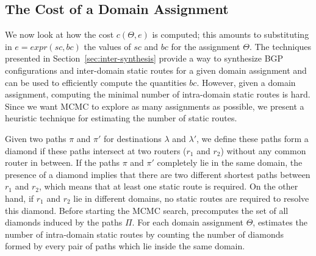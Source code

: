 \subsection{The Cost of a Domain Assignment}
We now look at how the cost  $c(\Theta,e)$
is computed; this amounts  
to substituting in 
$e=expr(sc, bc)$
the values of 
$sc$ and $bc$ for the assignment $\Theta$.
The techniques presented in Section~\ref{sec:inter-synthesis} 
provide a way to 
synthesize BGP configurations and 
inter-domain static routes for a 
given domain assignment
and can be used to 
efficiently compute the quantities $bc$.
However, given a domain assignment, 
computing the  
minimal number of intra-domain 
static routes 
is hard.
Since we want MCMC to 
explore as many assignments as possible,
we present a heuristic technique for estimating
 the number of static routes.



Given two paths $\pi$ and $\pi'$ for destinations 
$\lambda$ and $\lambda'$, we define these paths form a diamond
if these paths intersect at two routers ($r_1$ and $r_2$) 
without any common router in between. 
If the paths $\pi$ and $\pi'$ completely lie in the same domain,
the presence of a diamond 
implies that there are two different 
shortest paths between $r_1$ and $r_2$, 
which means that
at least one static route is required.
On the other hand, if $r_1$ and $r_2$ lie in
different domains, no static routes 
are required to resolve this diamond. 
Before  starting the MCMC search, \name precomputes
the set of all diamonds induced by the paths $\Pi$. 
For each
domain assignment $\Theta$,
\name estimates the number of intra-domain
static routes by counting the number of diamonds 
formed by every pair of paths which lie inside the same 
domain. 

